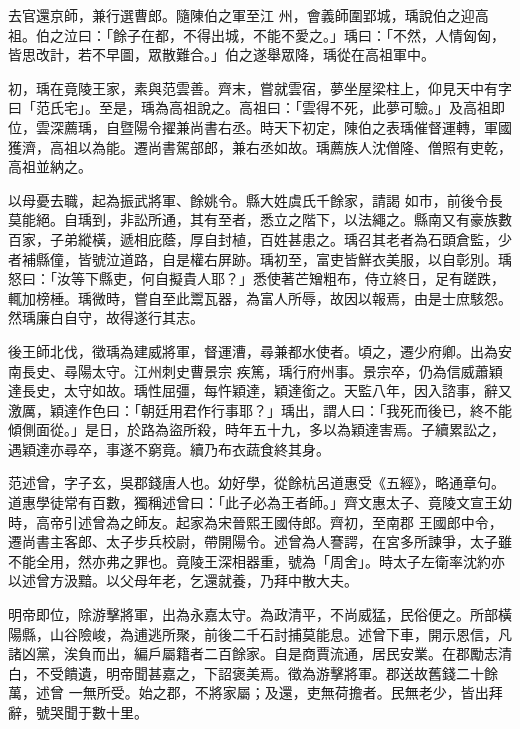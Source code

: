 \begin{pinyinscope}
 去官還京師，兼行選曹郎。隨陳伯之軍至江
 州，會義師圍郢城，瑀說伯之迎高祖。伯之泣曰：「餘子在都，不得出城，不能不愛之。」瑀曰：「不然，人情匈匈，皆思改計，若不早圖，眾散難合。」伯之遂舉眾降，瑀從在高祖軍中。



 初，瑀在竟陵王家，素與范雲善。齊末，嘗就雲宿，夢坐屋梁柱上，仰見天中有字曰「范氏宅」。至是，瑀為高祖說之。高祖曰：「雲得不死，此夢可驗。」及高祖即位，雲深薦瑀，自暨陽令擢兼尚書右丞。時天下初定，陳伯之表瑀催督運轉，軍國獲濟，高祖以為能。遷尚書駕部郎，兼右丞如故。瑀薦族人沈僧隆、僧照有吏乾，高祖並納之。



 以母憂去職，起為振武將軍、餘姚令。縣大姓虞氏千餘家，請謁
 如市，前後令長莫能絕。自瑀到，非訟所通，其有至者，悉立之階下，以法繩之。縣南又有豪族數百家，子弟縱橫，遞相庇蔭，厚自封植，百姓甚患之。瑀召其老者為石頭倉監，少者補縣僮，皆號泣道路，自是權右屏跡。瑀初至，富吏皆鮮衣美服，以自彰別。瑀怒曰：「汝等下縣吏，何自擬貴人耶？」悉使著芒矰粗布，侍立終日，足有蹉跌，輒加榜棰。瑀微時，嘗自至此鬻瓦器，為富人所辱，故因以報焉，由是士庶駭怨。然瑀廉白自守，故得遂行其志。



 後王師北伐，徵瑀為建威將軍，督運漕，尋兼都水使者。頃之，遷少府卿。出為安南長史、尋陽太守。江州刺史曹景宗
 疾篤，瑀行府州事。景宗卒，仍為信威蕭穎達長史，太守如故。瑀性屈彊，每忤穎達，穎達銜之。天監八年，因入諮事，辭又激厲，穎達作色曰：「朝廷用君作行事耶？」瑀出，謂人曰：「我死而後已，終不能傾側面從。」是日，於路為盜所殺，時年五十九，多以為穎達害焉。子續累訟之，遇穎達亦尋卒，事遂不窮竟。續乃布衣蔬食終其身。



 范述曾，字子玄，吳郡錢唐人也。幼好學，從餘杭呂道惠受《五經》，略通章句。道惠學徒常有百數，獨稱述曾曰：「此子必為王者師。」齊文惠太子、竟陵文宣王幼時，高帝引述曾為之師友。起家為宋晉熙王國侍郎。齊初，至南郡
 王國郎中令，遷尚書主客郎、太子步兵校尉，帶開陽令。述曾為人謇諤，在宮多所諫爭，太子雖不能全用，然亦弗之罪也。竟陵王深相器重，號為「周舍」。時太子左衛率沈約亦以述曾方汲黯。以父母年老，乞還就養，乃拜中散大夫。



 明帝即位，除游擊將軍，出為永嘉太守。為政清平，不尚威猛，民俗便之。所部橫陽縣，山谷險峻，為逋逃所聚，前後二千石討捕莫能息。述曾下車，開示恩信，凡諸凶黨，涘負而出，編戶屬籍者二百餘家。自是商賈流通，居民安業。在郡勵志清白，不受饋遺，明帝聞甚嘉之，下詔褒美焉。徵為游擊將軍。郡送故舊錢二十餘萬，述曾
 一無所受。始之郡，不將家屬；及還，吏無荷擔者。民無老少，皆出拜辭，號哭聞于數十里。




\end{pinyinscope}
